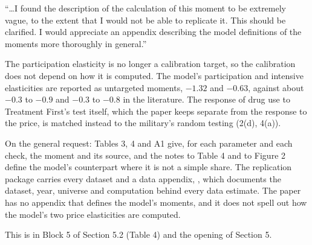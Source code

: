 \documentclass[11pt]{article}
\begin{document}
\begin{referee}
``\dots I found the description of the calculation of this moment to be extremely
vague, to the extent that I would not be able to replicate it. This should be
clarified. I would appreciate an appendix describing the model definitions of the
moments more thoroughly in general.''
\end{referee}
\begin{response}
The participation elasticity is no longer a calibration target, so the
calibration does not depend on how it is computed. The model's participation and
intensive elasticities are reported as untargeted moments, $-1.32$ and $-0.63$,
against about $-0.3$ to $-0.9$ and $-0.3$ to $-0.8$ in the literature. The
response of drug use to Treatment First's test itself, which the paper keeps
separate from the response to the price, is matched instead to the military's
random testing (2(d), 4(a)).

On the general request: Tables 3, 4 and A1 give, for each parameter and each
check, the moment and its source, and the notes to Table 4 and to Figure 2 define
the model's counterpart where it is not a simple share. The replication package
carries every dataset and a data appendix, , which
documents the dataset, year, universe and computation behind every data estimate.
\open The paper has no appendix that defines the model's moments, and it does not
spell out how the model's two price elasticities are computed.

This is in Block 5 of Section 5.2 (Table 4) and the opening of Section 5.
\end{response}
\end{document}
